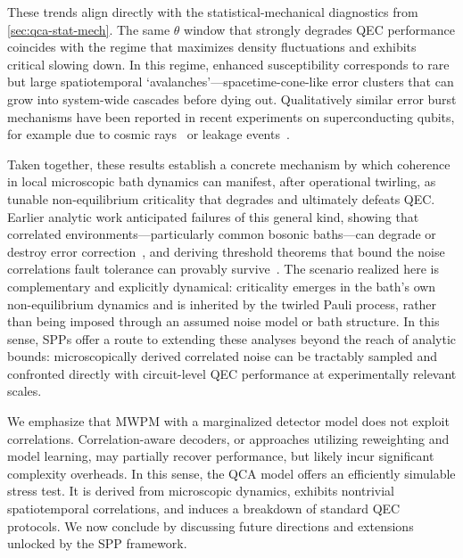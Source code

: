 \documentclass[
    aps,
    prx,
    reprint,
    superscriptaddress,
    longbibliography,
    nofootinbib,
    floatfix,
]{revtex4-2}
\begin{document}
These trends align directly with the statistical-mechanical diagnostics from \cref{sec:qca-stat-mech}. The same \(\theta\) window that strongly degrades QEC performance coincides with the regime that maximizes density fluctuations and exhibits critical slowing down. In this regime, enhanced susceptibility corresponds to rare but large spatiotemporal `avalanches'---spacetime-cone-like error clusters that can grow into system-wide cascades before dying out. Qualitatively similar error burst mechanisms have been reported in recent experiments on superconducting qubits, for example due to cosmic rays~\cite{mcewenResolvingCatastrophicError2022,liCosmicrayinducedCorrelatedErrors2025,harringtonSynchronousDetectionCosmic2025} or leakage events~\cite{mcewenRemovingLeakageinducedCorrelated2021,heExperimentalQuantumError2025}.

Taken together, these results establish a concrete mechanism by which coherence in local microscopic bath dynamics can manifest, after operational twirling, as tunable non-equilibrium criticality that degrades and ultimately defeats QEC. Earlier analytic work anticipated failures of this general kind, showing that correlated environments---particularly common bosonic baths---can degrade or destroy error correction~\cite{klesseQuantumErrorCorrection2005,novaisDecoherenceCorrelatedNoise2006,novaisSurfaceCodeThreshold2013,hutterBreakdownSurfacecodeError2014}, and deriving threshold theorems that bound the noise correlations fault tolerance can provably survive~\cite{terhalFaulttolerantQuantumComputation2005,aharonovFaultTolerantQuantumComputation2006,ngFaulttolerantQuantumComputation2009,preskillSufficientConditionNoise2013}. The scenario realized here is complementary and explicitly dynamical: criticality emerges in the bath's own non-equilibrium dynamics and is inherited by the twirled Pauli process, rather than being imposed through an assumed noise model or bath structure. In this sense, SPPs offer a route to extending these analyses beyond the reach of analytic bounds: microscopically derived correlated noise can be tractably sampled and confronted directly with circuit-level QEC performance at experimentally relevant scales.

We emphasize that MWPM with a marginalized detector model does not exploit correlations. Correlation-aware decoders, or approaches utilizing reweighting and model learning, may partially recover performance, but likely incur significant complexity overheads. In this sense, the QCA model offers an efficiently simulable stress test. It is derived from microscopic dynamics, exhibits nontrivial spatiotemporal correlations, and induces a breakdown of standard QEC protocols. We now conclude by discussing future directions and extensions unlocked by the SPP framework.
\end{document}
